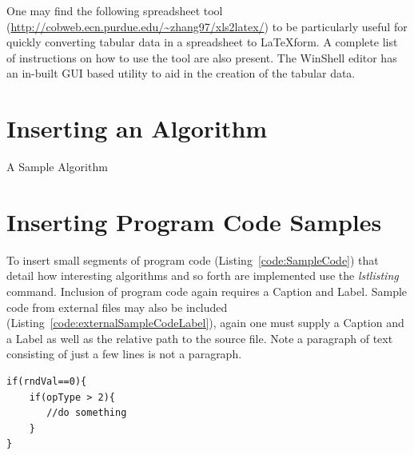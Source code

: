 One may find the following spreadsheet tool (\url{http://cobweb.ecn.purdue.edu/~zhang97/xls2latex/}) to be particularly useful for quickly converting tabular data in a spreadsheet to \LaTeX \space form. A complete list of instructions on how to use the tool are also present. The WinShell editor has an in-built GUI based utility to aid in the creation of the tabular data.

\section{Inserting an Algorithm}


\begin{algorithm}
{}
\caption{A Sample Algorithm} \label{alg:using:SampleAlgorithm}
\end{algorithm}

\section{Inserting Program Code Samples}

To insert small segments of program code (Listing~\ref{code:SampleCode}) that detail how interesting algorithms and so forth are implemented use the \emph{lstlisting} command. Inclusion of program code again requires a Caption and Label. Sample code from external files may also be included (Listing~\ref{code:externalSampleCodeLabel}), again one must supply a Caption and a Label as well as the relative path to the source file. Note a paragraph of text consisting of just a few lines is not a paragraph.



\begin{lstlisting}[caption=Sample Program Code Listing, label=code:SampleCode]
if(rndVal==0){
    if(opType > 2){
       //do something
    }
}
\end{lstlisting}





